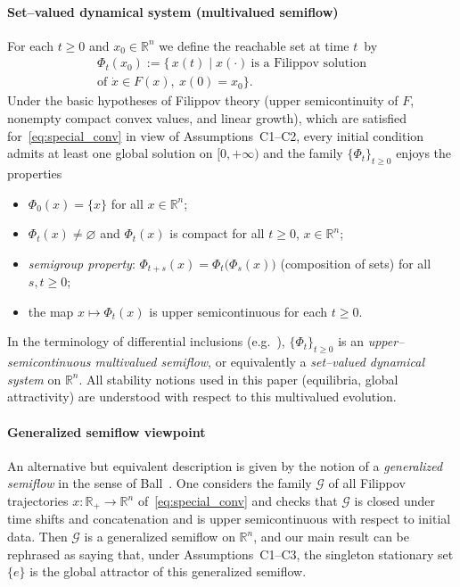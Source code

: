 \documentclass[journal]{IEEEtran}
\begin{document}
\paragraph*{Set–valued dynamical system (multivalued semiflow)}
For each $t\!\!\ge\!\!0$ and $x_0\!\in\!\mathbb{R}^n$ we define the reachable set
at time $t$~by
\begin{multline}\label{eq:Phi-t}
   \Phi_t(x_0)
   := \bigl\{\,x(t)\;\big|\;x(\cdot)\ \text{is a Filippov solution} \\ 
   \text{of } \dot x\in F(x),\ x(0)=x_0 \bigr\}.
\end{multline}
Under the basic hypotheses of Filippov theory (upper semicontinuity of
$F$, nonempty compact convex values, and linear growth), which are
satisfied for~\eqref{eq:special_conv} in view of Assumptions~C1–C2, every initial condition admits at least one global
solution on $[0,+\infty)$ and the family
$\{\Phi_t\}_{t\ge0}$ enjoys the properties
\begin{itemize}
  \item $\Phi_0(x)=\{x\}$ for all $x\in\mathbb{R}^n$;
  \item $\Phi_t(x)\neq\varnothing$ and $\Phi_t(x)$ is compact for all
        $t\ge0$, $x\in\mathbb{R}^n$;
  \item \emph{semigroup property}:
        $\Phi_{t+s}(x)=\Phi_t\bigl(\Phi_s(x)\bigr)$
        (composition of sets) for all $s,t\ge0$;
  \item the map $x\mapsto\Phi_t(x)$ is upper semicontinuous for each
        $t\ge0$.
\end{itemize}
In the terminology of differential inclusions
(e.g.~\cite{Filippov1988,AubinCellina1984,BenaimHofbauerSorin2005}),
$\{\Phi_t\}_{t\ge0}$ is an \emph{upper–semicontinuous multivalued
semiflow}, or equivalently a \emph{set–valued dynamical system} on
$\mathbb{R}^n$. All stability notions used in this paper (equilibria,
global attractivity) are understood with respect to this multivalued
evolution.

\smallskip
\paragraph*{Generalized semiflow viewpoint}
An alternative but equivalent description is given by the notion of a
\emph{generalized semiflow} in the sense of Ball~\cite{Ball1997}.  One
considers the family $\mathcal{G}$ of all Filippov trajectories
$x:\mathbb{R}_+\to\mathbb{R}^n$ of~\eqref{eq:special_conv} and checks
that $\mathcal{G}$ is closed under time shifts and concatenation and is
upper semicontinuous with respect to initial data.  Then
$\mathcal{G}$ is a generalized semiflow on $\mathbb{R}^n$, and our main
result can be rephrased as saying that, under Assumptions~C1–C3, the
singleton stationary set $\{e\}$ is the global attractor of this
generalized semiflow.
\end{document}
